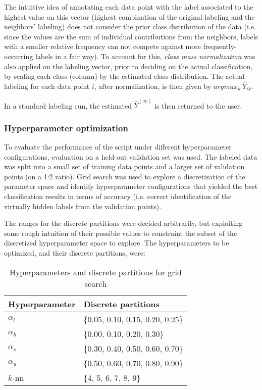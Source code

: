 \documentclass[oneside, a4paper, draft]{memoir} %
\begin{document}
The intuitive idea of annotating each data point with the label associated to the highest
value on this vector (highest combination of the original labeling and the neighbors' labeling) does not consider
the prior class distribution of the data (i.e. since the values are the sum of individual contributions from 
the neighbors, labels with a smaller relative frequency can not compete against more frequently-occurring labels
in a fair way). To account for this, \emph{class mass normalization}\cite{zhu2003semi} was also applied on the
labeling vector, prior to deciding on the actual classification, by scaling each class (column) by the estimated
class distribution. The actual labeling for each data point $i$, after normalization, is then given
by $argmax_k\ \hat{Y}_{ik}$.

In a standard labeling run, the estimated $\hat{Y}^{(\infty)}$ is then returned to the user.

\subsubsection{Hyperparameter optimization}
To evaluate the performance of the script under different hyperparameter configurations, evaluation on a held-out
validation set was used. The labeled data was split into a small set of training data points and a larger set
of validation points (on a 1:2 ratio). Grid search was used to explore a discretization of the parameter space and
identify hyperparameter configurations that yielded the best classification results in terms of accuracy (i.e. correct 
identification of the virtually hidden labels from the validation points).

The ranges for the discrete partitions were decided  arbitrarily, but
exploiting some rough intuition of their possible values to constraint the subset of the discretized hyperparameter
space to explore. The hyperparameters to be optimized, and their discrete partitions, were:
\begin{table}[here]
	\label{tbl:hyper}
	\centering
	\begin{tabular}{ll}
		\hline
		Hyperparameter & Discrete partitions\\
		\hline
		$\alpha_l$ & \{0.05, 0.10, 0.15, 0.20, 0.25\}\\
		$\alpha_h$ & \{0.00, 0.10, 0.20, 0.30\}\\
		$\alpha_s$ & \{0.30, 0.40, 0.50, 0.60, 0.70\}\\
		$\alpha_u$ & \{0.50, 0.60, 0.70, 0.80, 0.90\}\\
		$k$-nn & \{4, 5, 6, 7, 8, 9\}\\
		\hline
	\end{tabular}
	\caption{Hyperparameters and discrete partitions for grid search}
\end{table}
\end{document}
